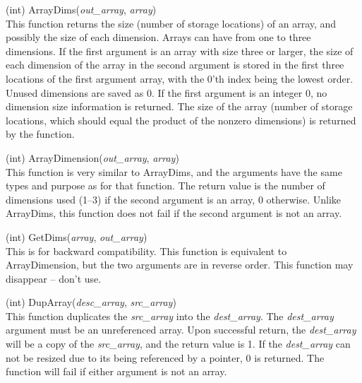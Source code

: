 \begin{description}
\item{(int) \vt ArrayDims({\it out\_array}, {\it array\/})}\\
This function returns the size (number of storage locations) of an
array, and possibly the size of each dimension.  Arrays can have from
one to three dimensions.  If the first argument is an array with size
three or larger, the size of each dimension of the array in the second
argument is stored in the first three locations of the first argument
array, with the 0'th index being the lowest order.  Unused dimensions
are saved as 0.  If the first argument is an integer 0, no dimension
size information is returned.  The size of the array (number of
storage locations, which should equal the product of the nonzero
dimensions) is returned by the function.

\item{(int) \vt ArrayDimension({\it out\_array}, {\it array\/})}\\
This function is very similar to {\vt ArrayDims}, and the arguments
have the same types and purpose as for that function.  The return
value is the number of dimensions used (1--3) if the second argument
is an array, 0 otherwise.  Unlike {\vt ArrayDims}, this function does
not fail if the second argument is not an array.

\item{(int) \vt GetDims({\it array\/}, {\it out\_array\/})}\\
This is for backward compatibility.  This function is equivalent to
{\vt ArrayDimension}, but the two arguments are in reverse order. 
This function may disappear -- don't use.

\item{(int) \vt DupArray({\it desc\_array}, {\it src\_array\/})}\\
This function duplicates the {\it src\_array} into the {\it
dest\_array}.  The {\it dest\_array} argument must be an unreferenced
array.  Upon successful return, the {\it dest\_array} will be a copy
of the {\it src\_array}, and the return value is 1.  If the {\it
dest\_array} can not be resized due to its being referenced by a
pointer, 0 is returned.  The function will fail if either argument is
not an array.


\end{description}
